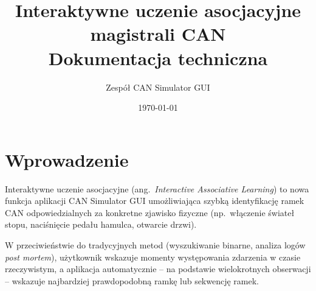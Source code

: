 \documentclass[a4paper,12pt]{article}
\title{Interaktywne uczenie asocjacyjne magistrali CAN\\Dokumentacja techniczna}
\author{Zespół CAN Simulator GUI}
\date{\today}
\begin{document}
\maketitle
\tableofcontents
\newpage

\section{Wprowadzenie}
Interaktywne uczenie asocjacyjne (ang.\ \emph{Interactive Associative Learning}) to nowa funkcja aplikacji CAN Simulator GUI umożliwiająca szybką identyfikację ramek CAN odpowiedzialnych za konkretne zjawisko fizyczne (np.\ włączenie świateł stopu, naciśnięcie pedału hamulca, otwarcie drzwi).

W przeciwieństwie do tradycyjnych metod (wyszukiwanie binarne, analiza logów \emph{post mortem}), użytkownik wskazuje momenty występowania zdarzenia w czasie rzeczywistym, a aplikacja automatycznie – na podstawie wielokrotnych obserwacji – wskazuje najbardziej prawdopodobną ramkę lub sekwencję ramek.
\end{document}
